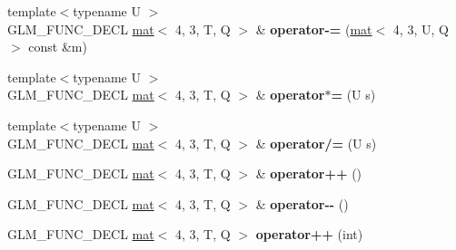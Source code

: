 \begin{DoxyCompactItemize}
\item 
\mbox{\label{structglm_1_1mat_3_014_00_013_00_01T_00_01Q_01_4_aafef14a762200cd1cbba9abb1d366d75}} 
{\footnotesize template$<$typename U $>$ }\\G\+L\+M\+\_\+\+F\+U\+N\+C\+\_\+\+D\+E\+CL \hyperlink{structglm_1_1mat}{mat}$<$ 4, 3, T, Q $>$ \& {\bfseries operator-\/=} (\hyperlink{structglm_1_1mat}{mat}$<$ 4, 3, U, Q $>$ const \&m)
\item 
\mbox{\label{structglm_1_1mat_3_014_00_013_00_01T_00_01Q_01_4_a023bcd2ba77d740cdc63219227571aca}} 
{\footnotesize template$<$typename U $>$ }\\G\+L\+M\+\_\+\+F\+U\+N\+C\+\_\+\+D\+E\+CL \hyperlink{structglm_1_1mat}{mat}$<$ 4, 3, T, Q $>$ \& {\bfseries operator$\ast$=} (U s)
\item 
\mbox{\label{structglm_1_1mat_3_014_00_013_00_01T_00_01Q_01_4_ae0dcc6b5b5a3d7aee42092985a16aeb6}} 
{\footnotesize template$<$typename U $>$ }\\G\+L\+M\+\_\+\+F\+U\+N\+C\+\_\+\+D\+E\+CL \hyperlink{structglm_1_1mat}{mat}$<$ 4, 3, T, Q $>$ \& {\bfseries operator/=} (U s)
\item 
\mbox{\label{structglm_1_1mat_3_014_00_013_00_01T_00_01Q_01_4_ab869177fe302f1cef14bbca99a103eb1}} 
G\+L\+M\+\_\+\+F\+U\+N\+C\+\_\+\+D\+E\+CL \hyperlink{structglm_1_1mat}{mat}$<$ 4, 3, T, Q $>$ \& {\bfseries operator++} ()
\item 
\mbox{\label{structglm_1_1mat_3_014_00_013_00_01T_00_01Q_01_4_aaa6df2edca16cfac23a2806f2fd8ae61}} 
G\+L\+M\+\_\+\+F\+U\+N\+C\+\_\+\+D\+E\+CL \hyperlink{structglm_1_1mat}{mat}$<$ 4, 3, T, Q $>$ \& {\bfseries operator-\/-\/} ()
\item 
\mbox{\label{structglm_1_1mat_3_014_00_013_00_01T_00_01Q_01_4_afe2cd1deac96a5b687a5978e44652428}} 
G\+L\+M\+\_\+\+F\+U\+N\+C\+\_\+\+D\+E\+CL \hyperlink{structglm_1_1mat}{mat}$<$ 4, 3, T, Q $>$ {\bfseries operator++} (int)
\item 
\mbox{\label{structglm_1_1mat_3_014_00_013_00_01T_00_01Q_01_4_a1071ca01aa47be09af44bbff97d99639}} 

\end{DoxyCompactItemize}
